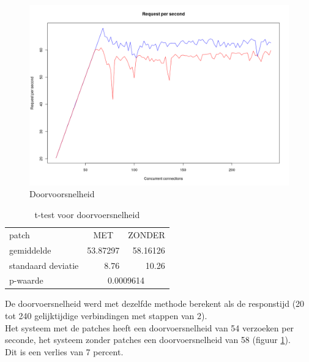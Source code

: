 \begin{figure}
	\includegraphics[width=1.0\linewidth]{img/rps.png}
	\caption{Doorvoorsnelheid}
	\label{fig:rps}
\end{figure}

\begin{table}[]
	\centering
	\caption{t-test voor doorvoersnelheid}
	\label{t_rps}
	\begin{tabular}{l|cr}
		\hline
		patch              & MET                          & \multicolumn{1}{c}{ZONDER} \\
		gemiddelde         & \multicolumn{1}{r}{53.87297} & 58.16126                   \\
		standaard deviatie & \multicolumn{1}{r}{8.76}     & 10.26                      \\ \hline
		p-waarde           & \multicolumn{2}{c|}{0.0009614}                           
	\end{tabular}
\end{table}

De doorvoersnelheid werd met dezelfde methode berekent als de responstijd (20 tot 240 gelijktijdige verbindingen met stappen van 2).\\
Het systeem met de patches heeft een doorvoersnelheid van 54 verzoeken per seconde, het systeem zonder patches een doorvoersnelheid van 58 (figuur \ref{fig:rps}).\\
Dit is een verlies van 7 percent.\\
